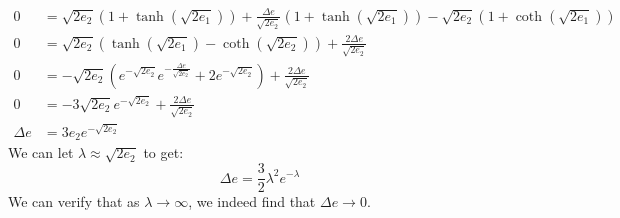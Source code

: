 \begin{sol}
\begin{enumerate}[label=\textbf{(\alph*)}]
\begin{align*}
    0 &= \sqrt{2e_2}(1+\tanh(\sqrt{2e_1}))+\frac{\Delta e}{\sqrt{2e_2}}(1+\tanh(\sqrt{2e_1}))-\sqrt{2e_2}(1+\coth(\sqrt{2e_1})) \\
    0 &= \sqrt{2e_2}\left(\tanh(\sqrt{2e_1})-\coth(\sqrt{2e_2})\right) + \frac{2\Delta e}{\sqrt{2e_2}} \\
    0 &= -\sqrt{2e_2}\left(e^{-\sqrt{2e_2}}e^{-\frac{\Delta e}{\sqrt{2e_2}}}+2e^{-\sqrt{2e_2}}\right) + \frac{2\Delta e}{\sqrt{2e_2}} \\
    0 &= -3\sqrt{2e_2}e^{-\sqrt{2e_2}} + \frac{2\Delta e}{\sqrt{2e_2}} \\
    \Delta e &= 3e_2e^{-\sqrt{2e_2}}
\end{align*}
We can let $\lambda \approx \sqrt{2e_2}$ to get:
$$\Delta e = \frac{3}{2}\lambda^2e^{-\lambda}$$
We can verify that as $\lambda \to \infty$, we indeed find that $\Delta e \to 0.$
\end{enumerate}
\end{sol}